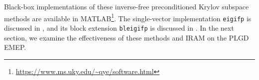 \begin{enumerate}
\begin{algorithm}[H]
\end{algorithm}


Black-box implementations of these inverse-free preconditioned Krylov subspace methods are available in MATLAB\footnote{\url{https://www.ms.uky.edu/~qye/software.html}}.  The single-vector implementation \texttt{eigifp} is discussed in \cite{money2005algorithm}, and its block extension \texttt{bleigifp} is discussed in \cite{quillen2010block}.  In the next section, we examine the effectiveness of these methods and IRAM on the PLGD EMEP.


\end{enumerate}


